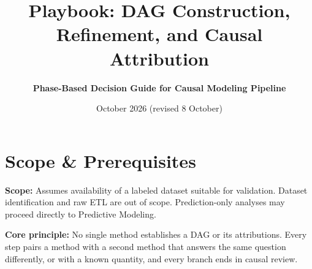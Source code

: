 \documentclass[10pt,a4paper]{article}
\title{\Large\textbf{Playbook: DAG Construction, Refinement, and Causal Attribution}}
\author{\small\textbf{Phase-Based Decision Guide for Causal Modeling Pipeline}}
\date{\small October 2026 (revised 8 October)}
\begin{document}
\maketitle
\vspace{-0.6cm}

\section*{Scope \& Prerequisites}
\small \textbf{Scope:} Assumes availability of a labeled dataset suitable for validation. Dataset identification and raw ETL are out of scope. Prediction-only analyses may proceed directly to Predictive Modeling.

\noindent\textbf{Core principle:} No single method establishes a DAG or its attributions. Every step pairs a method with a second method that answers the same question differently, or with a known quantity, and every branch ends in causal review.
\end{document}
